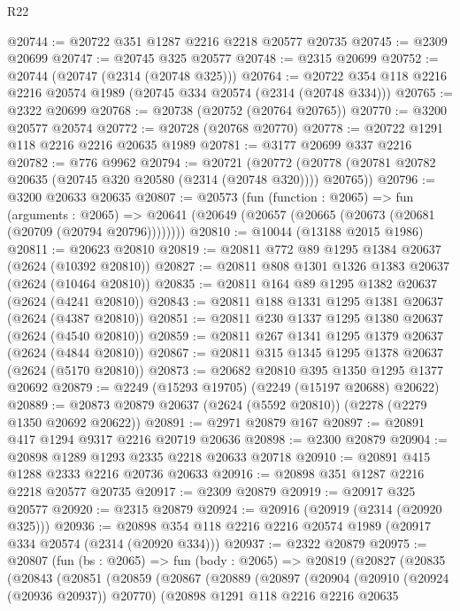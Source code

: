 \begin{lexlean}{R22}
\begin{coremodule}
@20744 := @20722 @351 @1287 @2216 @2218 @20577 @20735
@20745 := @2309 @20699
@20747 := @20745 @325 @20577
@20748 := @2315 @20699
@20752 := @20744 (@20747 (@2314 (@20748 @325)))
@20764 := @20722 @354 @118 @2216 @2216 @20574 @1989 (@20745 @334 @20574 (@2314 (@20748 @334)))
@20765 := @2322 @20699
@20768 := @20738 (@20752 (@20764 @20765))
@20770 := @3200 @20577 @20574
@20772 := @20728 (@20768 @20770)
@20778 := @20722 @1291 @118 @2216 @2216 @20635 @1989
@20781 := @3177 @20699 @337 @2216
@20782 := @776 @9962
@20794 := @20721
    (@20772 (@20778 (@20781 @20782 @20635 (@20745 @320 @20580 (@2314 (@20748 @320)))) @20765))
@20796 := @3200 @20633 @20635
@20807 := @20573
    (fun (function : @2065) =>
    fun (arguments : @2065) =>
    @20641 (@20649 (@20657 (@20665 (@20673 (@20681 (@20709 (@20794 @20796))))))))
@20810 := @10044 (@13188 @2015 @1986)
@20811 := @20623 @20810
@20819 := @20811 @772 @89 @1295 @1384 @20637 (@2624 (@10392 @20810))
@20827 := @20811 @808 @1301 @1326 @1383 @20637 (@2624 (@10464 @20810))
@20835 := @20811 @164 @89 @1295 @1382 @20637 (@2624 (@4241 @20810))
@20843 := @20811 @188 @1331 @1295 @1381 @20637 (@2624 (@4387 @20810))
@20851 := @20811 @230 @1337 @1295 @1380 @20637 (@2624 (@4540 @20810))
@20859 := @20811 @267 @1341 @1295 @1379 @20637 (@2624 (@4844 @20810))
@20867 := @20811 @315 @1345 @1295 @1378 @20637 (@2624 (@5170 @20810))
@20873 := @20682 @20810 @395 @1350 @1295 @1377 @20692
@20879 := @2249 (@15293 @19705) (@2249 (@15197 @20688) @20622)
@20889 := @20873 @20879 @20637 (@2624 (@5592 @20810)) (@2278 (@2279 @1350 @20692 @20622))
@20891 := @2971 @20879 @167
@20897 := @20891 @417 @1294 @9317 @2216 @20719 @20636
@20898 := @2300 @20879
@20904 := @20898 @1289 @1293 @2335 @2218 @20633 @20718
@20910 := @20891 @415 @1288 @2333 @2216 @20736 @20633
@20916 := @20898 @351 @1287 @2216 @2218 @20577 @20735
@20917 := @2309 @20879
@20919 := @20917 @325 @20577
@20920 := @2315 @20879
@20924 := @20916 (@20919 (@2314 (@20920 @325)))
@20936 := @20898 @354 @118 @2216 @2216 @20574 @1989 (@20917 @334 @20574 (@2314 (@20920 @334)))
@20937 := @2322 @20879
@20975 := @20807
    (fun (bs : @2065) =>
    fun (body : @2065) =>
    @20819
      (@20827
        (@20835
          (@20843
            (@20851
              (@20859
                (@20867
                  (@20889
                    (@20897
                      (@20904
                        (@20910 (@20924 (@20936 @20937)) @20770)
                        (@20898
                          @1291
                          @118
                          @2216
                          @2216
                          @20635

\end{coremodule}
\end{lexlean}

